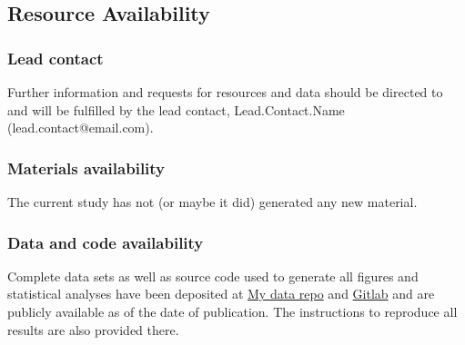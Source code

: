 \subsection*{Resource Availability}
\label{subsec:resources}

\subsubsection*{Lead contact}
\label{subsubsec:contact}

Further information and requests for resources and data should be directed to and will be fulfilled by the lead contact, Lead.Contact.Name (lead.contact@email.com). 

\subsubsection*{Materials availability}
\label{subsubsec:materials}
The current study has not (or maybe it did) generated any new material.

\subsubsection*{Data and code availability}
\label{subsubsec:data}
Complete data sets as well as source code used to generate all figures and statistical analyses have been deposited at \href{https://google.com}{My data repo} and \href{https://gitlab.com/}{Gitlab} and are publicly available as of the date of publication. 
The instructions to reproduce all results are also provided there.
